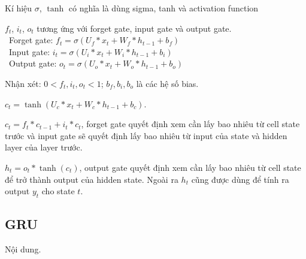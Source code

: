 Kí hiệu \(\sigma\), \(\tanh\) có nghĩa là dùng sigma, tanh và activation function
\par
\( f_t \), \( i_t \), \( o_t \) tương ứng với forget gate, input gate và output gate.\\
    \indent\textbullet\ Forget gate: \( f_t = \sigma\left(U_f \ast x_t + W_f \ast h_{t-1} + b_f\right) \)\\
    \indent\textbullet\ Input gate: \( i_t = \sigma\left(U_i \ast x_t + W_i \ast h_{t-1} + b_i\right) \)\\
    \indent\textbullet\ Output gate: \( o_t = \sigma\left(U_o \ast x_t + W_o \ast h_{t-1} + b_o\right) \)
\par
Nhận xét: \( 0 < f_t, i_t, o_t < 1 \); \( b_f, b_i, b_o \) là các hệ số bias.
\par
\( c_t = \tanh\left(U_c \ast x_t + W_c \ast h_{t-1} + b_c\right) \).
\par
\( c_t = f_t \ast c_{t-1} + i_t \ast c_t \), forget gate quyết định xem cần lấy bao nhiêu từ cell state trước và input gate sẽ quyết định lấy bao nhiêu từ input của state và hidden layer của layer trước.
\par
\( h_t = o_t \ast \tanh\left(c_t\right) \), output gate quyết định xem cần lấy bao nhiêu từ cell state để trở thành output của hidden state. Ngoài ra \( h_t \) cũng được dùng để tính ra output \( y_t \) cho state \( t \).


\subsection{GRU}
Nội dung.

